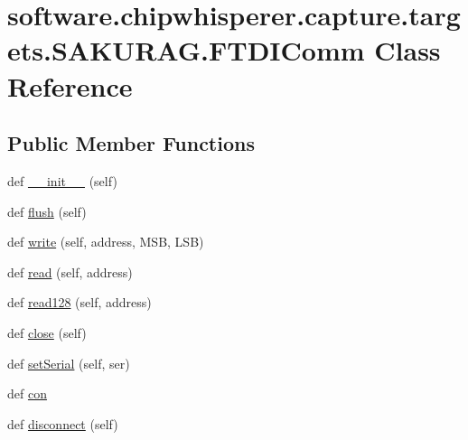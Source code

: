 \hypertarget{classsoftware_1_1chipwhisperer_1_1capture_1_1targets_1_1SAKURAG_1_1FTDIComm}{}\section{software.\+chipwhisperer.\+capture.\+targets.\+S\+A\+K\+U\+R\+A\+G.\+F\+T\+D\+I\+Comm Class Reference}
\label{classsoftware_1_1chipwhisperer_1_1capture_1_1targets_1_1SAKURAG_1_1FTDIComm}
\subsection*{Public Member Functions}
\begin{DoxyCompactItemize}
\item 
def \hyperlink{classsoftware_1_1chipwhisperer_1_1capture_1_1targets_1_1SAKURAG_1_1FTDIComm_a559190015b562771b8a3bdd295a03279}{\+\_\+\+\_\+init\+\_\+\+\_\+} (self)
\item 
def \hyperlink{classsoftware_1_1chipwhisperer_1_1capture_1_1targets_1_1SAKURAG_1_1FTDIComm_ab8e7c11143a4f2a0532bd6849aeac2f8}{flush} (self)
\item 
def \hyperlink{classsoftware_1_1chipwhisperer_1_1capture_1_1targets_1_1SAKURAG_1_1FTDIComm_af435b4f60a30ded16e06e9a5e33f7be2}{write} (self, address, M\+S\+B, L\+S\+B)
\item 
def \hyperlink{classsoftware_1_1chipwhisperer_1_1capture_1_1targets_1_1SAKURAG_1_1FTDIComm_a5e23ae5ce56fca205a3c9c2560a0e270}{read} (self, address)
\item 
def \hyperlink{classsoftware_1_1chipwhisperer_1_1capture_1_1targets_1_1SAKURAG_1_1FTDIComm_aa4bfdb8ecfdc7f4296f404331f08f6cc}{read128} (self, address)
\item 
def \hyperlink{classsoftware_1_1chipwhisperer_1_1capture_1_1targets_1_1SAKURAG_1_1FTDIComm_a907423119ddc69c73c45140d767bbae3}{close} (self)
\item 
def \hyperlink{classsoftware_1_1chipwhisperer_1_1capture_1_1targets_1_1SAKURAG_1_1FTDIComm_a4098cfafb89a96368b945aeaa988530c}{set\+Serial} (self, ser)
\item 
def \hyperlink{classsoftware_1_1chipwhisperer_1_1capture_1_1targets_1_1SAKURAG_1_1FTDIComm_a754fe8592136f9750aca6f3d8c203675}{con}
\item 
def \hyperlink{classsoftware_1_1chipwhisperer_1_1capture_1_1targets_1_1SAKURAG_1_1FTDIComm_a538e07bf4c966c16fa21df42a4ac86bd}{disconnect} (self)
\end{DoxyCompactItemize}
